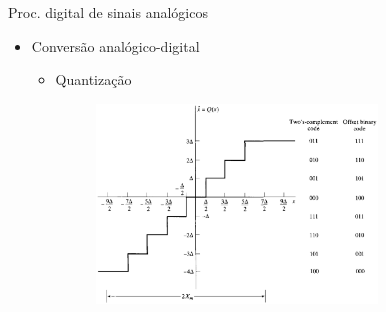 \begin{slide}{Proc. digital de sinais anal\'ogicos}
\begin{itemize}
   \item Conversão analógico-digital
   \begin{itemize}
      \item Quantização 
      \begin{figure}
        \centering
         \includegraphics[width = 0.75\textwidth]{figs/ad_quantz.eps}
      \end{figure}

   \end{itemize}
\end{itemize}
\end{slide}


